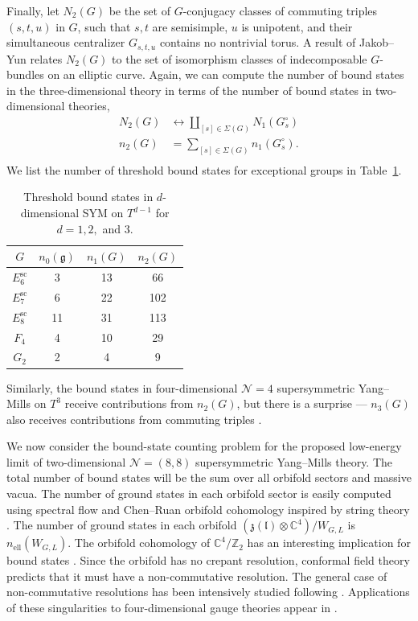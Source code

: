 \documentclass[12pt]{article}
\numberwithin{equation}{section}%
\theoremstyle{definition}
\newcommand{\cN}{\mathcal{N}}
\newcommand{\bC}{\mathbb{C}}
\newcommand{\bZ}{\mathbb{Z}}
\DeclareMathOperator{\elliptic}{ell}
\begin{document}
Finally, let $N_2(G)$ be the set of $G$-conjugacy classes of commuting triples $(s,t,u)$ in $G$, such that $s,t$ are semisimple, $u$ is unipotent, and their simultaneous centralizer $G_{s,t,u}$ contains no nontrivial torus.  A result of Jakob--Yun relates $N_2(G)$ to the set of isomorphism classes of indecomposable $G$-bundles on an elliptic curve.  Again, we can compute the number
of bound states in the three-dimensional theory in terms of the number of bound states in two-dimensional theories,
\begin{align*}
N_2(G) & \leftrightarrow \coprod_{[s] \in \Sigma(G)} N_1(G^{\circ}_s) \\
n_2(G) & = \sum_{[s] \in \Sigma(G)} n_1(G^{\circ}_s). \\
\end{align*}
We list the number of threshold bound states for exceptional groups in Table~\ref{tab:boundstates}.
\begin{table}[htp]
\begin{center}
\begin{tabular}{cccc}
\toprule
$G$ & $n_0(\mathfrak{g})$ & $n_1(G)$ & $n_2(G)$ \\
\midrule
$E_6^{\text{sc}}$ & 3 & 13 & 66 \\
\hline
$E_7^{\text{sc}}$ & 6 & 22 & 102 \\
\hline
$E_8^{\text{sc}}$ & 11 & 31 & 113 \\
\hline
$F_4$ & 4 & 10 & 29 \\
\hline
$G_2$ & 2 & 4 & 9 \\
\bottomrule
\end{tabular}
\end{center}
\caption{Threshold bound states in $d$-dimensional SYM on $T^{d-1}$ for $d = 1,2,$ and $3$.}
\label{tab:boundstates}
\end{table}%
Similarly, the bound states in four-dimensional $\cN = 4$ supersymmetric Yang--Mills on $T^3$ receive contributions from $n_2(G)$, but there is a surprise --- $n_3(G)$ also receives contributions from commuting triples
\cite{Witten:1997bs, Kac:1999gw, Witten:2000nv}.

We now consider the bound-state counting problem for the proposed low-energy limit of two-dimensional $\cN = (8,8)$ supersymmetric Yang--Mills theory.  The total number of bound states will be the sum over all orbifold sectors and massive vacua.  The number of ground states in each orbifold sector is easily computed using spectral flow and Chen--Ruan orbifold cohomology \cite{MR2104605} inspired by string theory \cite{Dixon:1985jw}.
The number of ground states in each orbifold $\left( \mathfrak{z}(\mathfrak{l}) \otimes \bC^4 \right)/W_{G,L}$ is $n_{\elliptic}(W_{G,L})$.  The orbifold cohomology of $\bC^4/\bZ_2$ has an interesting implication for bound states \cite{Dijkgraaf:1997vv, Dijkgraaf:1997ku}.  Since the orbifold has no crepant resolution, conformal field theory predicts that it must have a non-commutative resolution.  The general case of non-commutative resolutions has been intensively studied following \cite{MR1792746}.  Applications of these singularities to four-dimensional gauge theories appear in \cite{Cecotti:2025lns}.
\end{document}
